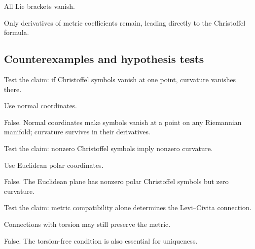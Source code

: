 \begin{hint}
All Lie brackets vanish.
\end{hint}

\begin{solution}
Only derivatives of metric coefficients remain, leading directly to the Christoffel formula.
\end{solution}

\subsection*{Counterexamples and hypothesis tests}

\begin{exercise}\label{exr:vii22-ped-10}
Test the claim: if Christoffel symbols vanish at one point, curvature vanishes there.
\end{exercise}

\begin{hint}
Use normal coordinates.
\end{hint}

\begin{solution}
False.  Normal coordinates make symbols vanish at a point on any Riemannian manifold; curvature survives in their derivatives.
\end{solution}

\begin{exercise}\label{exr:vii22-ped-11}
Test the claim: nonzero Christoffel symbols imply nonzero curvature.
\end{exercise}

\begin{hint}
Use Euclidean polar coordinates.
\end{hint}

\begin{solution}
False.  The Euclidean plane has nonzero polar Christoffel symbols but zero curvature.
\end{solution}

\begin{exercise}\label{exr:vii22-ped-12}
Test the claim: metric compatibility alone determines the Levi--Civita connection.
\end{exercise}

\begin{hint}
Connections with torsion may still preserve the metric.
\end{hint}

\begin{solution}
False.  The torsion-free condition is also essential for uniqueness.
\end{solution}

